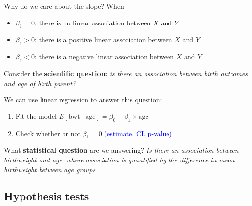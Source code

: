 \documentclass[10pt,t]{beamer}
\begin{document}
\begin{frame}{Why do we care about the slope?}
When
\begin{itemize}
	\item $\beta_1 = 0$: there is no linear association between $X$ and $Y$
	\item $\beta_1 > 0$: there is a positive linear association between $X$ and $Y$
	\item $\beta_1 < 0$: there is a negative linear association between $X$ and $Y$
\end{itemize}

\vspace{0.3cm}

Consider the \textbf{scientific question:} \textit{is there an association between birth outcomes and age of birth parent?}

\vspace{0.3cm}

We can use linear regression to answer this question:

\begin{enumerate}
	\item Fit the model $E[\text{bwt} \mid \text{age}] = \beta_0 + \beta_1 \times \text{age}$
	\item Check whether or not $\beta_1 = 0$ \textcolor{blue}{(estimate, CI, p-value)}
\end{enumerate}

\vspace{0.3cm}

What \textbf{statistical question} are we answering? \textit{Is there an association between birthweight and age, where association is quantified by the difference in mean birthweight between age groups}

\end{frame}

\subsection{Hypothesis tests}
\end{document}
